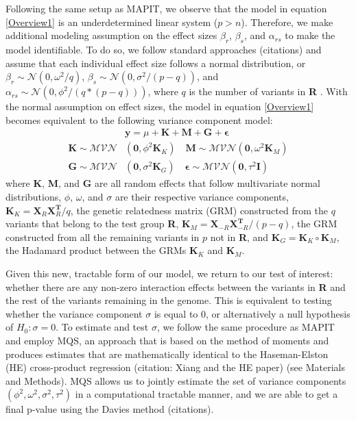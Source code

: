 \documentclass[12pt,a4paper]{article}
\begin{document}
Following the same setup as MAPIT, we observe that the model in equation \ref{Overview1} is an underdetermined linear system ($p > n$). Therefore, we make additional modeling assumption on the effect sizes $\beta_r$, $\beta_s$, and $\alpha_{rs}$ to make the model identifiable. To do so, we follow standard approaches (citations) and assume that each individual effect size follows a normal distribution, or $\beta_r \sim \mathcal{N}(0, \omega^2/q)$, $\beta_s \sim \mathcal{N}(0, \sigma^2/(p-q))$, and $\alpha_{rs} \sim \mathcal{N}(0, \phi^2/(q*(p-q)))$, where $q$ is the number of variants in \textbf{R} \citep{Crawford2017a}. With the normal assumption on effect sizes, the model in equation \ref{Overview1} becomes equivalent to the following variance component model:
\begin{align}\label{Overview2}
    & \textbf{y} = \mu + \textbf{K} + \textbf{M} + \textbf{G} + \boldsymbol{\epsilon} \\
    \textbf{K} \sim \mathcal{MVN}&(\textbf{0}, \phi^{2}\textbf{K}_K) \quad \textbf{M} \sim \mathcal{MVN}(\textbf{0}, \omega^{2}\textbf{K}_M) \nonumber \\ 
    \textbf{G} \sim \mathcal{MVN}&(\textbf{0}, \sigma^{2}\textbf{K}_G) \quad \boldsymbol{\epsilon} \sim \mathcal{MVN}(\textbf{0}, \tau^{2}\textbf{I}) \nonumber 
\end{align}
where \textbf{K}, \textbf{M}, and \textbf{G} are all random effects that follow multivariate normal distributions, $\phi$, $\omega$, and $\sigma$ are their respective variance components, $\textbf{K}_K = \textbf{X}_{R}\textbf{X}^{\textbf{T}}_{R}/q$, the genetic relatedness matrix (GRM) constructed from the $q$ variants that belong to the test group \textbf{R}, $\textbf{K}_M = \textbf{X}_{-R}\textbf{X}^{\textbf{T}}_{-R}/(p-q)$, the GRM constructed from all the remaining variants in $p$ not in \textbf{R}, and $\textbf{K}_G = \textbf{K}_K \circ \textbf{K}_M$, the Hadamard product between the GRMs $\textbf{K}_K$ and $\textbf{K}_M$.

Given this new, tractable form of our model, we return to our test of interest: whether there are any non-zero interaction effects between the variants in \textbf{R} and the rest of the variants remaining in the genome. This is equivalent to testing whether the variance component $\sigma$ is equal to 0, or alternatively a null hypothesis of $H_0: \sigma = 0$. To estimate and test $\sigma$, we follow the same procedure as MAPIT and employ MQS, an approach that is based on the method of moments and produces estimates that are mathematically identical to the Haseman-Elston (HE) cross-product regression (citation: Xiang and the HE paper) (see Materials and Methods). MQS allows us to jointly estimate the set of variance components $(\phi^{2}, \omega^{2}, \sigma^{2}, \tau^{2})$ in a computational tractable manner, and we are able to get a final p-value using the Davies method (citations).  
\end{document}
